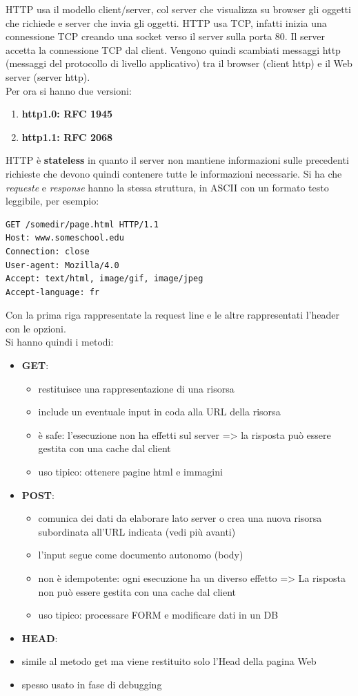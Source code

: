 \documentclass[a4paper,12pt, oneside]{book}
\begin{document}
HTTP usa il modello client/server, col server che visualizza su browser gli oggetti che richiede e server che invia gli oggetti. HTTP usa TCP, infatti inizia una connessione TCP creando una socket verso il server sulla porta 80. Il server accetta la connessione TCP dal client. Vengono quindi scambiati messaggi http (messaggi del protocollo
di livello applicativo) tra il browser (client http) e il Web
server (server http).\\
Per ora si hanno due versioni:
\begin{enumerate}
	\item\textbf{ http1.0: RFC 1945}
	\item\textbf{ http1.1: RFC 2068}
\end{enumerate}
HTTP è \textbf{stateless} in quanto il server non mantiene informazioni sulle precedenti richieste che devono quindi contenere tutte le informazioni necessarie. Si ha che \textit{requeste }e \textit{response} hanno la stessa struttura, in ASCII con un formato testo leggibile, per esempio:
\begin{verbatim}
GET /somedir/page.html HTTP/1.1
Host: www.someschool.edu
Connection: close
User-agent: Mozilla/4.0
Accept: text/html, image/gif, image/jpeg
Accept-language: fr
\end{verbatim}
Con la prima riga rappresentate la request line e le altre rappresentati l'header con le opzioni.\\
Si hanno quindi i metodi:
\begin{itemize}
	\item \textbf{GET}:
	      \begin{itemize}
		      \item restituisce una rappresentazione di una risorsa
		      \item include un eventuale input in coda alla URL della risorsa
		      \item è safe: l'esecuzione non ha effetti sul server
		            => la risposta può essere gestita con una cache dal client
		      \item uso tipico: ottenere pagine html e immagini
	      \end{itemize}
	\item \textbf{POST}:
	      \begin{itemize}
		      \item comunica dei dati da elaborare lato server o crea una nuova risorsa
		            subordinata all’URL indicata (vedi più avanti)
		      \item l'input segue come documento autonomo (body)
		      \item non è idempotente: ogni esecuzione ha un diverso effetto
		            => La risposta non può essere gestita con una cache dal client
		      \item uso tipico: processare FORM e modificare dati in un DB
	      \end{itemize}
	\item \textbf{HEAD}:
	\item simile al metodo get ma viene restituito solo l’Head della pagina Web
	\item spesso usato in fase di debugging
\end{itemize}
\end{document}
